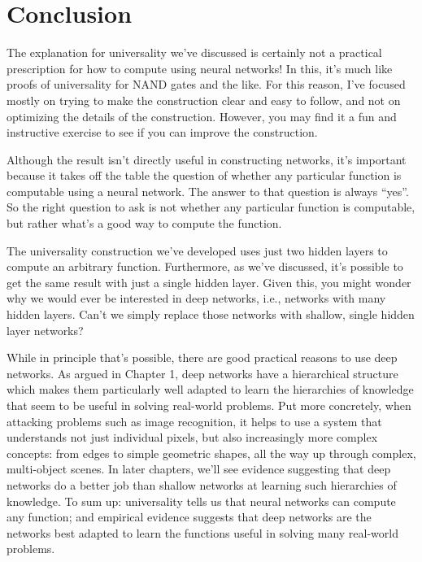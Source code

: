 \documentclass[a4paper,twoside,10pt]{book}
\begin{document}
\section*{Conclusion}
The explanation for universality we've discussed is certainly not a practical prescription for how to compute using neural networks! In this, it's much like proofs of universality for NAND gates and the like. For this reason, I've focused mostly on trying to make the construction clear and easy to follow, and not on optimizing the details of the construction. However, you may find it a fun and instructive exercise to see if you can improve the construction.

Although the result isn't directly useful in constructing networks, it's important because it takes off the table the question of whether any particular function is computable using a neural network. The answer to that question is always ``yes''. So the right question to ask is not whether any particular function is computable, but rather what's a good way to compute the function.

The universality construction we've developed uses just two hidden layers to compute an arbitrary function. Furthermore, as we've discussed, it's possible to get the same result with just a single hidden layer. Given this, you might wonder why we would ever be interested in deep networks, i.e., networks with many hidden layers. Can't we simply replace those networks with shallow, single hidden layer networks?


While in principle that's possible, there are good practical reasons to use deep networks. As argued in Chapter 1, deep networks have a hierarchical structure which makes them particularly well adapted to learn the hierarchies of knowledge that seem to be useful in solving real-world problems. Put more concretely, when attacking problems such as image recognition, it helps to use a system that understands not just individual pixels, but also increasingly more complex concepts: from edges to simple geometric shapes, all the way up through complex, multi-object scenes. In later chapters, we'll see evidence suggesting that deep networks do a better job than shallow networks at learning such hierarchies of knowledge. To sum up: universality tells us that neural networks can compute any function; and empirical evidence suggests that deep networks are the networks best adapted to learn the functions useful in solving many real-world problems.
\end{document}
